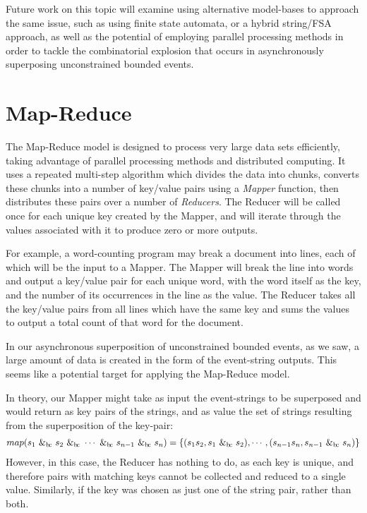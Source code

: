 \documentclass[a4paper,11pt]{article}
\newcommand{\bc}{{\rm b\!c}}
\begin{document}
Future work on this topic will examine using alternative model-bases to 
approach the same issue, such as using finite state automata, or a hybrid 
string/FSA approach, as well as the potential of employing parallel processing 
methods in order to tackle the combinatorial explosion that occurs in 
asynchronously superposing unconstrained bounded events.
{}


\appendix
\section{Map-Reduce}
The Map-Reduce model is designed to process very large data sets efficiently, 
taking advantage of parallel processing methods and distributed computing. It 
uses a repeated multi-step algorithm which divides the data into chunks, 
converts these chunks into a number of key/value pairs using a \textit{Mapper} 
function, then distributes these pairs over a number of \textit{Reducers}. The 
Reducer will be called once for each unique key created by the Mapper, and will 
iterate through the values associated with it to produce zero or more outputs.

For example, a word-counting program may break a document into lines, each of 
which will be the input to a Mapper. The Mapper will break the line into words 
and output a key/value pair for each unique word, with the word itself as the 
key, and the number of its occurrences in the line as the value. The Reducer 
takes all the key/value pairs from all lines which have the same key and sums 
the values to output a total count of that word for the document.

In our asynchronous superposition of unconstrained bounded events, as we saw, a 
large amount of data is created in the form of the event-string outputs. This 
seems like a potential target for applying the Map-Reduce model.%

In theory, our Mapper might take as input the event-strings to be 
superposed and would return as key pairs of the strings, and as value the set 
of strings resulting from the superposition of the key-pair:
\begin{align*}
map(s_1 ~\&_{\bc}~ s_2 ~\&_{\bc}~ \cdots ~\&_{\bc}~ s_{n-1} ~\&_{\bc}~ s_n) = 
\{(s_1s_2, s_1 ~\&_{\bc}~ s_2), \cdots, (s_{n-1}s_n, s_{n-1} ~\&_{\bc}~ s_n)\}
\end{align*}
However, in this case, the Reducer has nothing to do, as each key is unique, 
and therefore pairs with matching keys cannot be collected and reduced to a 
single value. Similarly, if the key was chosen as just one of the string pair, 
rather than both.
\end{document}
